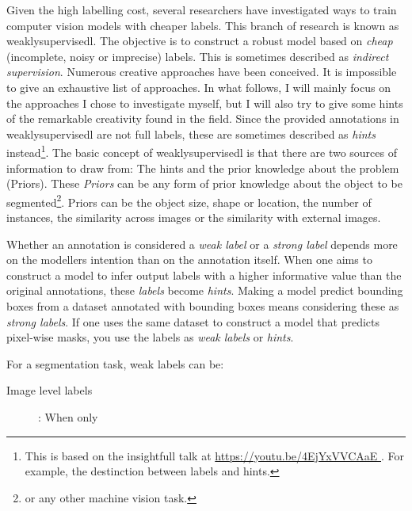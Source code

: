 Given the high labelling cost, several researchers have investigated ways to train computer vision models with cheaper labels.
This branch of research is known as \Gls{weaklysupervisedl}.
The objective is to construct a robust model based on \textit{cheap} (incomplete, noisy or imprecise) labels. 
This is sometimes described as \textit{indirect supervision}.
Numerous creative approaches have been conceived. 
It is impossible to give an exhaustive list of approaches. 
In what follows, I will mainly focus on the approaches I chose to investigate myself, but I will also try to give some hints of the remarkable creativity found in the field.
Since the provided annotations in \Gls{weaklysupervisedl} are not full labels, these are sometimes described as \textit{hints} instead\footnote{
    This is based on the insightfull talk at \url{ 
        https://youtu.be/4EjYxVVCAaE
    }. For example, the destinction between labels and hints.
}.
The basic concept of \Gls{weaklysupervisedl} is that there are two sources of information to draw from: The hints and the prior knowledge about the problem (Priors).
These \textit{Priors} can be any form of prior knowledge about the object to be segmented\footnote{or any other machine vision task.}.
Priors can be the object size, shape or location, the number of instances, the similarity across images or the similarity with external images.

Whether an annotation is considered a \textit{weak label} or a \textit{strong label} depends more on the modellers intention than on the annotation itself. 
When one aims to construct a model to infer output labels with a higher informative value than the original annotations, these \textit{labels} become \textit{hints}.
Making a model predict bounding boxes from a dataset annotated with bounding boxes means considering these as \textit{strong labels}. 
If one uses the same dataset to construct a model that predicts pixel-wise masks, you use the labels as \textit{weak labels} or \textit{hints}.

For a segmentation task, weak labels can be:
\begin{description}
    \item[Image level labels]: When only  
\end{description}

